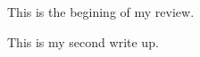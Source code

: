 \documentclass[a4paper,12pt]{report}
\begin{document}
   This is the begining of my review. 
   
   This is my second write up.
\end{document}
